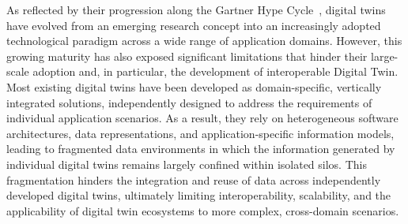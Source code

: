 As reflected by their progression along the Gartner Hype Cycle~, digital twins have evolved from an emerging research concept into an increasingly adopted technological paradigm across a wide range of application domains.
%
However, this growing maturity has also exposed significant limitations that hinder their large-scale adoption and, in particular, the development of interoperable Digital Twin.
%
Most existing digital twins have been developed as domain-specific, vertically integrated solutions, independently designed to address the requirements of individual application scenarios.
%
As a result, they rely on heterogeneous software architectures, data representations, and application-specific information models, leading to fragmented data environments in which the information generated by individual digital twins remains largely confined within isolated silos.
%
This fragmentation hinders the integration and reuse of data across independently developed digital twins, ultimately limiting interoperability, scalability, and the applicability of digital twin ecosystems to more complex, cross-domain scenarios.

